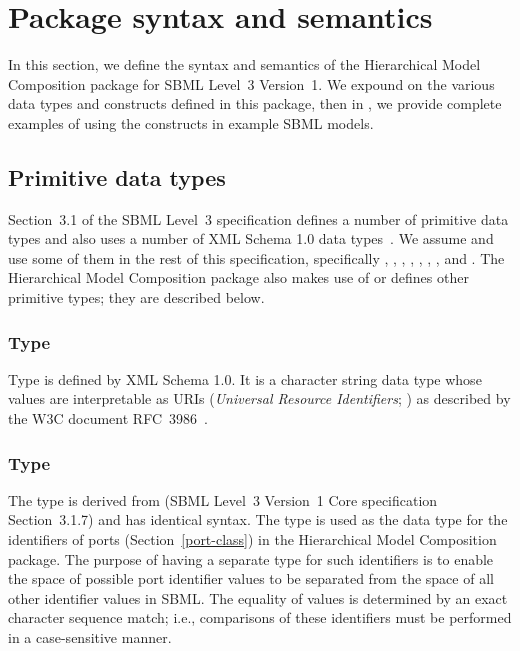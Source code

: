 
\section{Package syntax and semantics}
\label{sec:syntax}

In this section, we define the syntax and semantics of the Hierarchical
Model Composition package for SBML Level~3 Version~1.  We expound on the
various data types and constructs defined in this package, then in
, we provide complete examples of using the constructs in
example SBML models.


\subsection{Primitive data types}
\label{new-primitive-types}

Section~3.1 of the SBML Level~3 specification defines a number of
primitive data types and also uses a number of XML Schema 1.0 data
types~\citep{biron:2000}.  We assume and use some of them in the rest of
this specification, specifically , ,
, , , ,
, and .  The Hierarchical Model
Composition package also makes use of or defines other primitive types;
they are described below.


\subsubsection{Type \hspace*{1pt}}
\label{primtype-anyuri}
\label{primtype-uri}

Type  is defined by XML Schema 1.0.  It is a character
string data type whose values are interpretable as URIs (\emph{Universal
  Resource Identifiers}; \citealt{harold:2001,w3c:2000}) as described by
the W3C document RFC~3986~\citep{rfc3986}.


\subsubsection{Type \hspace*{1pt}}
\label{primtype-portid}

The type  is derived from  (SBML Level~3
Version~1 Core specification Section~3.1.7) and has identical syntax.
The  type is used as the data type for the identifiers
of ports (Section~\ref{port-class}) in the Hierarchical Model Composition
package.  The purpose of having a separate type for such identifiers is
to enable the space of possible port identifier values to be separated
from the space of all other identifier values in SBML.  The equality of
 values is determined by an exact character sequence
match; i.e., comparisons of these identifiers must be performed in a
case-sensitive manner.


